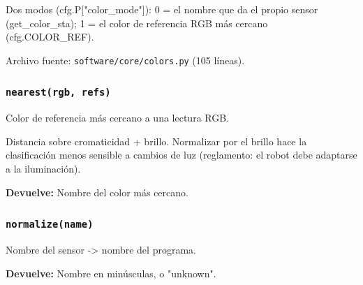 Dos modos (cfg.P["color\_mode"]): 0 = el nombre que da el propio sensor (get\_color\_sta); 1 = el color de referencia RGB más cercano (cfg.COLOR\_REF).

\noindent Archivo fuente: \texttt{software/core/colors.py} (105 l\'ineas).

\subsubsection{\texttt{nearest(rgb, refs)}}\label{fn:colors:nearest}
\noindent Color de referencia más cercano a una lectura RGB.

Distancia sobre cromaticidad + brillo. Normalizar por el brillo hace la clasificación menos sensible a cambios de luz (reglamento: el robot debe adaptarse a la iluminación).

\par{}\par\smallskip
\noindent\textbf{Devuelve:} Nombre del color más cercano.\par

\subsubsection{\texttt{normalize(name)}}\label{fn:colors:normalize}
\noindent Nombre del sensor -> nombre del programa.

\par{}\par\smallskip
\noindent\textbf{Devuelve:} Nombre en minúsculas, o "unknown".\par

